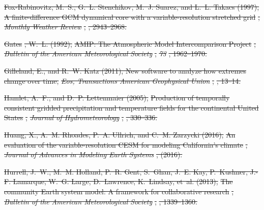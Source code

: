 \documentclass[draft,ms]{agutex}   %
\providecommand{\DIFdel}[1]{{\protect\color{red}\sout{#1}}}                      %
\begin{document}
\begin{article}
\DIFdel{Fox-Rabinovitz, M.~S., G.~L. Stenchikov, M.~J. Suarez, and L.~L. Takacs (1997),
  }%
\DIFdel{A finite-difference GCM dynamical core with a variable-resolution stretched
  grid}%
\DIFdel{, }\textit{\DIFdel{Monthly Weather Review}}%
\DIFdel{, }%
\DIFdel{, 2943--2968.
}%

\DIFdel{Gates}%
\DIFdel{, W.~L. (1992), }%
\DIFdel{AMIP: The Atmospheric Model Intercomparison Project}%
\DIFdel{,
  }\textit{\DIFdel{Bulletin of the American Meteorological Society}}%
\DIFdel{, }\textit{\DIFdel{73}}%
\DIFdel{,
  1962--1970.
}%

\DIFdel{Gilleland, E., and R.~W. Katz (2011), New software to analyze how extremes
  change over time, }\textit{\DIFdel{Eos, Transactions American Geophysical Union}}%
\DIFdel{,
  }%
\DIFdel{, 13--14.
}%

\DIFdel{Hamlet, A.~F., and D.~P. Lettenmaier (2005), }%
\DIFdel{Production of temporally
  consistent gridded precipitation and temperature fields for the continental
  United States}%
\DIFdel{, }\textit{\DIFdel{Journal of Hydrometeorology}}%
\DIFdel{, }%
\DIFdel{,
  330--336.
}%

\DIFdel{Huang, X., A.~M. Rhoades, P.~A. Ullrich, and C.~M. Zarzycki (2016), }%
\DIFdel{An
  evaluation of the variable-resolution CESM for modeling California's
  climate}%
\DIFdel{, }\textit{\DIFdel{Journal of Advances in Modeling Earth Systems}}%
\DIFdel{, (2016).
}%

\DIFdel{Hurrell, J.~W., M.~M. Holland, P.~R. Gent, S.~Ghan, J.~E. Kay, P.~Kushner,
  J.-F. Lamarque, W.~G. Large, D.~Lawrence, K.~Lindsay, et~al. (2013), }%
\DIFdel{The
  community Earth system model: A framework for collaborative research}%
\DIFdel{,
  }\textit{\DIFdel{Bulletin of the American Meteorological Society}}%
\DIFdel{, }%
\DIFdel{,
  1339--1360.
}%


\end{article}
\end{document}

